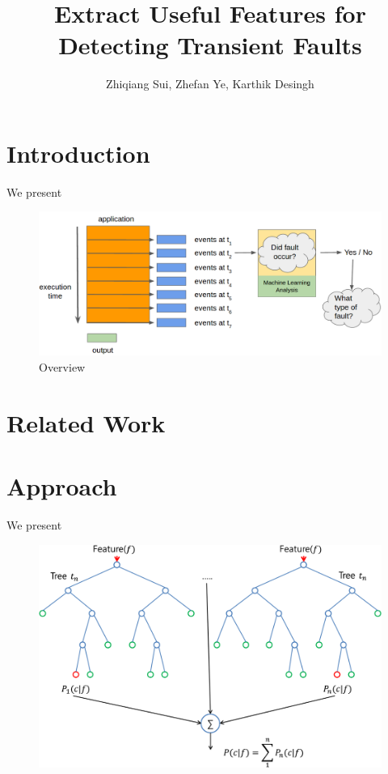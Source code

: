 \documentclass{sig-alternate}
\title{Extract Useful Features for Detecting Transient Faults}
\author{Zhiqiang Sui, Zhefan Ye, Karthik Desingh}
\begin{document}
\maketitle
\thispagestyle{firstpage}
\pagestyle{plain}

\begin{abstract}

\end{abstract}

\section{Introduction}
We present 

\begin{figure}[t]
\begin{center}
   \includegraphics[width=0.95\linewidth]{./figures/teaser.png}
\end{center}
   \caption{Overview}
\label{fig:teaser}
\end{figure}

\section{Related Work}

\section{Approach}
We present

\begin{figure}[t]
\begin{center}
   \includegraphics[width=0.95\linewidth]{./figures/rf.png}
\end{center}
   \caption{}
\label{fig:rf}
\end{figure}
\end{document}
